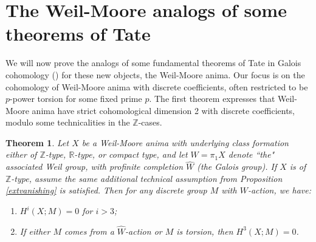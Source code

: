 \documentclass[12pt]{article}
\newtheorem{theorem}{Theorem}[section]
\theoremstyle{definition}
\newcommand{\mbb}{\mathbb}
\newcommand{\wh}{\widehat}
\begin{document}
\section{The Weil-Moore analogs of some theorems of Tate}

We will now prove the analogs of some fundamental theorems of Tate in Galois cohomology (\cite{tateduality}) for these new objects, the Weil-Moore anima.  Our focus is on the cohomology of Weil-Moore anima with discrete coefficients, often restricted to be $p$-power torsion for some fixed prime $p$.  The first theorem expresses that Weil-Moore anima have strict cohomological dimension 2 with discrete coefficients, modulo some technicalities in the $\mbb{Z}$-cases.

\begin{theorem}\label{strictcohdim}
Let $X$ be a Weil-Moore anima with underlying class formation either of $\mbb{Z}$-type, $\mbb{R}$-type, or compact type, and let $W=\pi_1X$ denote ``the" associated Weil group, with profinite completion $\wh{W}$ (the Galois group).  If $X$ is of $\mbb{Z}$-type, assume the same additional technical assumption from Proposition \ref{extvanishing} is satisfied. Then for any discrete group $M$ with $W$-action, we have:
\begin{enumerate}
\item $H^i(X;M)=0$ for $i>3$;
\item If either $M$ comes from a $\wh{W}$-action or $M$ is torsion, then $H^3(X;M)=0$.
\end{enumerate}
\end{theorem}
\end{document}
